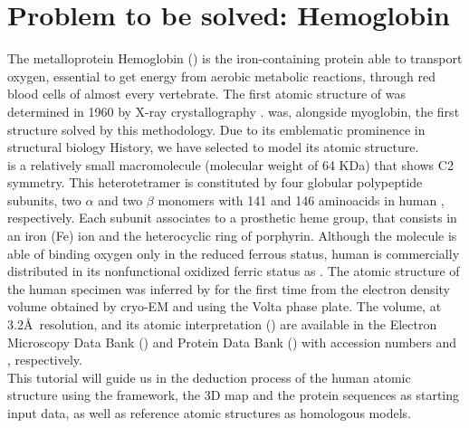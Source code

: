 
\section{Problem to be solved: Hemoglobin}

The metalloprotein Hemoglobin () is the iron-containing protein able to transport oxygen, essential to get energy from aerobic metabolic reactions, through red blood cells of almost every vertebrate. The first atomic structure of  was determined in 1960 by X-ray crystallography \citep{perutz1960}.  was, alongside myoglobin, the first structure solved by this methodology. Due to its emblematic prominence in structural biology History, we have selected  to model its atomic structure.\\

 is a relatively small macromolecule (molecular weight of 64 KDa) that shows C2 symmetry. This heterotetramer is constituted by four globular polypeptide subunits, two $\alpha$ and two $\beta$ monomers with 141 and 146 aminoacids in human , respectively. Each subunit associates to a prosthetic heme group, that consists in an iron (Fe) ion and the heterocyclic ring of porphyrin. Although the molecule is able of binding oxygen only in the reduced ferrous status, human  is commercially distributed in its nonfunctional oxidized ferric status as . The atomic structure of the human  specimen was inferred by \citep{khoshouei2017} for the first time from the electron density volume obtained by cryo-EM and using the Volta phase plate. The volume, at 3.2\AA\ resolution, and its atomic interpretation () are available in the Electron Microscopy Data Bank () and Protein Data Bank () with accession numbers  and , respectively.\\

This tutorial will guide us in the deduction process of the human  atomic structure using the \scipion framework, the 3D map and the protein sequences as starting input data, as well as reference atomic structures as homologous models. %
